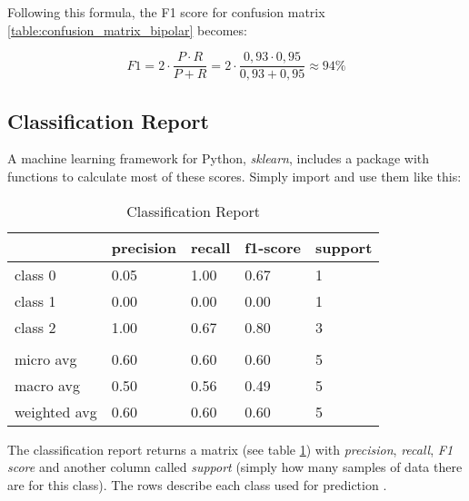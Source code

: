 Following this formula, the F1 score for confusion matrix \ref{table:confusion_matrix_bipolar} becomes:

\[
  F1 = 2 \cdot \frac{P \cdot R}{P + R} = 2 \cdot \frac{0,93 \cdot 0,95}{0,93 + 0,95} \approx 94\%
\]

\subsection{Classification Report}

A machine learning framework for Python, \textit{sklearn}, includes a package with functions to calculate most of these scores. 
Simply import and use them like this: 



\begin{table}
  \begin{tabular}{| l | l | l | l | l |}
    \hline
                  & precision & recall  & f1-score & support \\ \hline
    class 0       & 0.05      & 1.00    & 0.67     & 1       \\
    class 1       & 0.00      & 0.00    & 0.00     & 1       \\
    class 2       & 1.00      & 0.67    & 0.80     & 3       \\
                  &           &         &          &         \\ 
    micro avg     & 0.60      & 0.60    & 0.60     & 5       \\
    macro avg     & 0.50      & 0.56    & 0.49     & 5       \\
    weighted avg  & 0.60      & 0.60    & 0.60     & 5       \\
    \hline
  \end{tabular}
  \caption{Classification Report}
  \label{table:classification_report}
\end{table}

The classification report returns a matrix (see table \ref{table:classification_report}) with \textit{precision}, 
\textit{recall}, \textit{F1 score} and another column called \textit{support} (simply how many samples of data there are for this class). 
The rows describe each class used for prediction \cite{sklearn_classification_report}.